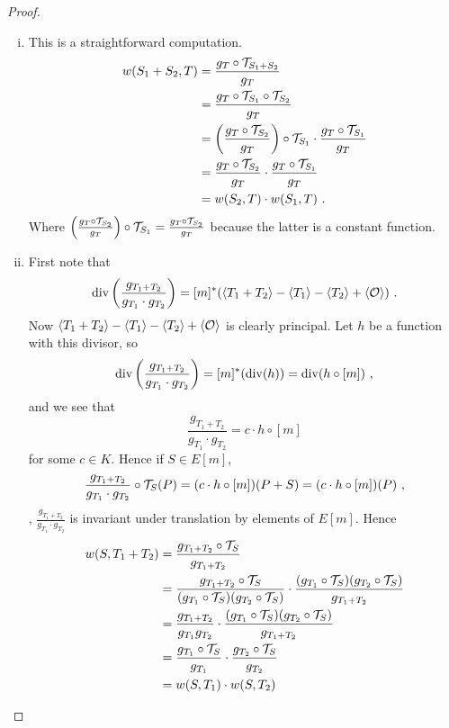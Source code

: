 \begin{proof}

\begin{enumerate}[(i)]
\item
This is a straightforward computation.
\begin{align*}
w(S_{1}+S_{2},T)&=\frac{g_{T}\circ \mathcal{T}_{S_1+S_2}}{g_T}\\
&=\frac{g_T\circ \mathcal{T}_{S_1}\circ \mathcal{T}_{S_2}}{g_T}\\
&=\left(\frac{g_{T}\circ \mathcal{T}_{S_2}}{g_T}\right)\circ \mathcal{T}_{S_1}\cdot\frac{g_{T}\circ \mathcal{T}_{S_1}}{g_{T}}\\
&=\frac{g_{T}\circ \mathcal{T}_{S_2}}{g_T} \cdot\frac{g_{T}\circ \mathcal{T}_{S_1}}{g_{T}}\\
&=w(S_{2},T)\cdot w(S_1,T)\ .
\end{align*}
Where $\left(\frac{g_{T}\circ \mathcal{T}_{S_2}}{g_T}\right)\circ \mathcal{T}_{S_1} = \frac{g_{T}\circ \mathcal{T}_{S_2}}{g_T}$ because the latter is a constant function.
\item
First note that
$$
\operatorname{div}\left(\frac{g_{T_{1}+T_{2}}}{g_{T_{1}}\cdot g_{T_{2}}}\right)=[m]^{*}(\left\langle T_{1} + T_{2} \right \rangle - \left\langle T_{1} \right \rangle - \left\langle T_{2} \right \rangle + \left\langle \mathcal{O} \right \rangle)\ .
$$
Now $\left\langle T_{1}+T_{2} \right \rangle - \left\langle T_{1} \right \rangle - \left\langle T_{2} \right \rangle + \left\langle \mathcal{O} \right \rangle$ is clearly principal. Let $h$ be a function with this divisor, so
$$
\operatorname{div}\left(\frac{g_{T_{1}+T_{2}}}{g_{T_{1}}\cdot g_{T_{2}}}\right)=[m]^{*}(\operatorname{div}(h))=\operatorname{div}(h\circ[m])\ ,
$$
and we see that
$$
\frac{g_{T_{1}+T_{2}}}{g_{T_{1}}\cdot g_{T_{2}}}=c\cdot h\circ[m]
$$
for some $c\in K$. Hence if $S\in E[m]$,
$$
\frac{g_{T_{1}+T_{2}}}{g_{T_{1}}\cdot g_{T_{2}}}\circ \mathcal{T}_{S}(P)=(c\cdot h\circ[m])(P+S)=(c\cdot h\circ[m])(P)\ ,
$$
\ie, $\frac{g_{T_{1}+T_{2}}}{g_{T_{1}}\cdot g_{T_{2}}}$ is invariant under translation by elements of $E[m]$. Hence
\begin{align*}
w(S,T_{1}+T_{2})&=\frac{g_{T_{1}+T_{2}}\circ \transl{S}}{g_{T_{1}+T_{2}}}\\
&=\frac{g_{T_{1}+T_{2}}\circ \transl{S}}{(g_{T_{1}}\circ \transl{S})(g_{T_{2}}\circ \transl{S})}\cdot \frac{(g_{T_{1}}\circ \transl{S})(g_{T_{2}}\circ \transl{S})}{g_{T_{1}+T_{2}}}\\
&=\frac{g_{T_{1}+T_{2}}}{g_{T_{1}} g_{T_{2}}} \cdot \frac{(g_{T_{1}}\circ \transl{S})(g_{T_{2}}\circ \transl{S})}{g_{T_{1}+T_{2}}}\\
&=\frac{g_{T_{1}}\circ \transl{S}}{g_{T_{1}}}\cdot\frac{g_{T_{2}}\circ \transl{S}}{g_{T_{2}}}\\
&=w(S, T_{1})\cdot w(S, T_{2})

\end{align*}
\end{enumerate}
\end{proof}
